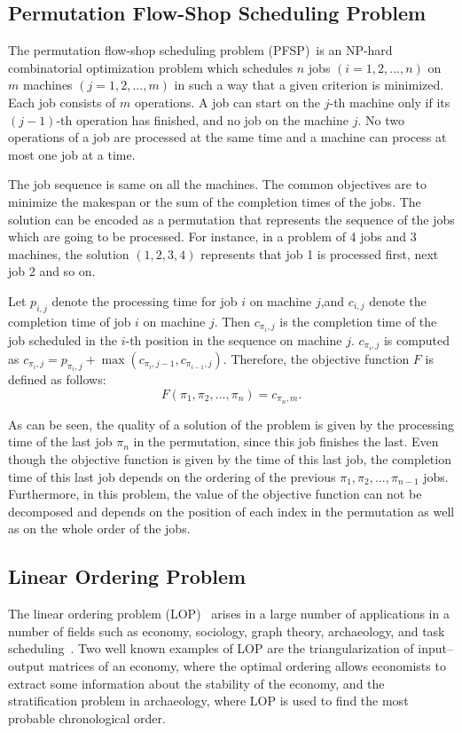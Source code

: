 \subsection{Permutation Flow-Shop Scheduling Problem}
The permutation flow-shop scheduling problem (PFSP)~\citep{gupta2006flowshop french1982sequencing, allahverdi2008survey}is an NP-hard combinatorial optimization problem which schedules $n$ jobs $(i = 1,2,...,n)$ on $m$ machines $(j = 1,2,...,m)$ in such a way that a given criterion is minimized. Each job consists of $m$ operations. A job can start on the $j$-th machine only if its $(j-1)$-th operation has finished, and no job on the machine $j$. No two operations of a job are processed at the same time and a machine can process at most one job at a time.  

The job sequence is same on all the machines. The common objectives are to minimize the makespan or the sum of the completion times of the jobs. The solution can be encoded as a permutation that represents the sequence of the jobs which are going to be processed. For instance, in a problem of 4 jobs and 3 machines, the solution $(1,2,3,4)$ represents that job 1 is processed first, next job 2 and so on.

Let $p_{i,j}$ denote the processing time for job $i$ on machine $j$,and $c_{i,j}$ denote the
completion time of job $i$ on machine $j$. Then $c_{\pi_{i},j}$ is the completion time of the job scheduled in the $i$-th position in the sequence on machine $j$. $c_{\pi_{i},j}$ is computed as $c_{\pi_{i},j} = p_{\pi_i,j} + \max{ (c_{\pi_{i},j-1},c_{\pi_{i-1},j}) }$. Therefore, the objective function $F$ is defined as follows:
\begin{equation*}
	F(\pi_1, \pi_2, ... , \pi_n) = c_{\pi_n,m} \text{.}
\end{equation*}

As can be seen, the quality of a solution of the problem is given by the processing time of the last job $\pi_n$ in the permutation, since this job finishes the last. Even though the objective function is given by the time of this last job, the completion time of this last job depends on the ordering of the previous $\pi_1, \pi_2, ... , \pi_{n-1}$ jobs. Furthermore, in this problem, the value of the objective function can not be decomposed and depends on the position of each index in the permutation as well as on the whole order of the jobs.


\subsection{Linear Ordering Problem}
The linear ordering problem (LOP)~\citep{marti2011linear} arises in a large number of applications in a number of fields such as economy, sociology, graph theory, archaeology, and task scheduling~\citep{schiavinotto2004}. Two well known examples of LOP are the triangularization of input–output matrices of an economy, where the optimal ordering allows economists to extract some information about the stability of the economy, and the stratification problem in archaeology, where LOP is used to find the most probable chronological order.

